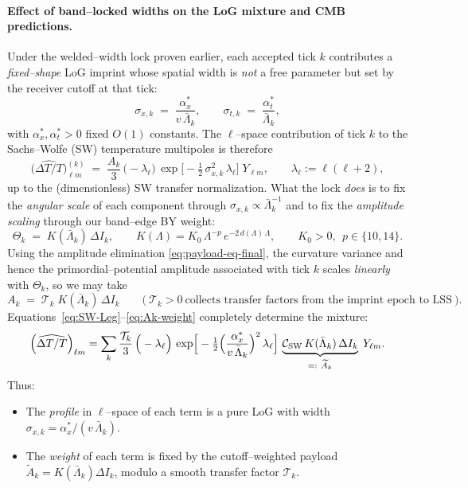 \documentclass[10pt]{article}
\theoremstyle{definition}
\theoremstyle{plain}
\begin{document}
\paragraph{Effect of band–locked widths on the LoG mixture and CMB predictions.}\label{par:uom-main-163}
Under the welded–width lock proven earlier, each accepted tick $k$ contributes a \emph{fixed–shape} LoG imprint
whose spatial width is \emph{not} a free parameter but set by the receiver cutoff at that tick:
\[
\sigma_{x,k}\;=\;\frac{\alpha_x^{*}}{v\,\bar\Lambda_k},\qquad \sigma_{t,k}\;=\;\frac{\alpha_t^{*}}{\bar\Lambda_k},
\]
with $\alpha_x^{*},\alpha_t^{*}>0$ fixed $O(1)$ constants. The $\ell$–space contribution of tick $k$ to the
Sachs–Wolfe (SW) temperature multipoles is therefore
\begin{equation}\label{eq:SW-Leg}
\Big(\widehat{\Delta T/T}\Big)^{(k)}_{\ell m}
\;=\;\frac{A_k}{3}\,\Big(-\lambda_\ell\Big)\,
\exp\!\Big[-\tfrac12\,\sigma_{x,k}^2\,\lambda_\ell\Big]\;Y_{\ell m},\qquad \lambda_\ell:=\ell(\ell+2),
\end{equation}
up to the (dimensionless) SW transfer normalization. What the lock \emph{does} is to fix
the \emph{angular scale} of each component through $\sigma_{x,k}\propto \bar\Lambda_k^{-1}$ and to fix the
\emph{amplitude scaling} through our band–edge BY weight:
\[
\Theta_k\;=\;K(\bar\Lambda_k)\,\Delta I_k,\qquad
K(\Lambda)=K_0\,\Lambda^{-p}\,e^{-2\,d(\Lambda)\,\Lambda},\qquad K_0>0,\ \ p\in\{10,14\}.
\]
Using the amplitude elimination \eqref{eq:payload-eq-final}, the curvature variance and
hence the primordial–potential amplitude associated with tick $k$ scales \emph{linearly} with $\Theta_k$,
so we may take
\begin{equation}\label{eq:Ak-weight}
A_k\;=\;\mathcal T_k\;K(\bar\Lambda_k)\,\Delta I_k\qquad\big(\ \mathcal T_k>0\ \text{collects transfer factors from the imprint epoch to LSS}\ \big).
\end{equation}
Equations~\eqref{eq:SW-Leg}–\eqref{eq:Ak-weight} completely determine the mixture:
\begin{equation}\label{eq:mix-locked}
\Big(\widehat{\Delta T/T}\Big)_{\ell m}
=\sum_{k}\frac{\mathcal T_k}{3}\,\Big(-\lambda_\ell\Big)\,
\exp\!\Big[-\tfrac12\Big(\frac{\alpha_x^{*}}{v\,\bar\Lambda_k}\Big)^2\,\lambda_\ell\Big]\,
\underbrace{\mathcal C_{\rm SW}\,K(\bar\Lambda_k)\,\Delta I_k}_{=:~\widetilde A_k}\;Y_{\ell m}.
\end{equation}
Thus:
\begin{itemize}
\item The \emph{profile} in $\ell$–space of each term is a pure LoG with width \(\sigma_{x,k}=\alpha_x^{*}/(v\,\bar\Lambda_k)\).
\item The \emph{weight} of each term is fixed by the cutoff–weighted payload \(\widetilde A_k= K(\bar\Lambda_k)\Delta I_k\),
modulo a smooth transfer factor \(\mathcal T_k\).
\end{itemize}
\end{document}
